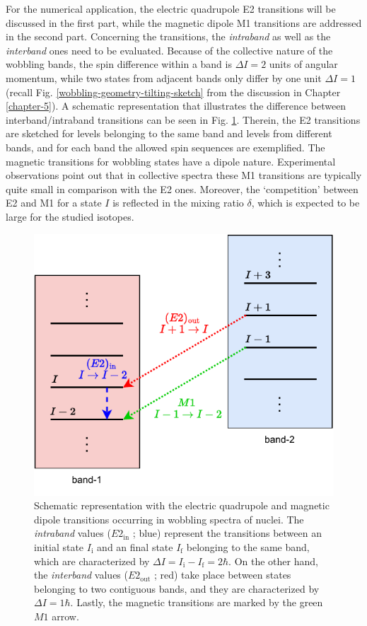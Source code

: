 For the numerical application, the electric quadrupole E2 transitions will be discussed in the first part, while the magnetic dipole M1 transitions are addressed in the second part. Concerning the transitions, the \emph{intraband} as well as the \emph{interband} ones need to be evaluated. Because of the collective nature of the wobbling bands, the spin difference within a band is $\Delta I=2$ units of angular momentum, while two states from adjacent bands only differ by one unit $\Delta I=1$ (recall Fig. \ref{wobbling-geometry-tilting-sketch} from the discussion in Chapter \ref{chapter-5}). A schematic representation that illustrates the difference between interband/intraband transitions can be seen in Fig. \ref{schematic-interband-intraband-E2}. Therein, the E2 transitions are sketched for levels belonging to the same band and levels from different bands, and for each band the allowed spin sequences are exemplified. The magnetic transitions for wobbling states have a dipole nature. Experimental observations point out that in collective spectra these M1 transitions are typically quite small in comparison with the E2 ones. Moreover, the `competition' between E2 and M1 for a state $I$ is reflected in the mixing ratio $\delta$, which is expected to be large for the studied isotopes. 
\begin{figure}
    \centering
    \includegraphics[scale=1.1]{Chapters/Figures/transitions-wobbling-states.pdf}
    \caption{Schematic representation with the electric quadrupole and magnetic dipole transitions occurring in wobbling spectra of nuclei. The \emph{intraband} values ($E2_\text{in}$ ; blue) represent the transitions between an initial state $I_\text{i}$ and an final state $I_\text{f}$ belonging to the same band, which are characterized by $\Delta I=I_\text{i}-I_\text{f}=2\hbar$. On the other hand, the \emph{interband} values ($E2_\text{out}$ ; red) take place between states belonging to two contiguous bands, and they are characterized by $\Delta I=1\hbar$. Lastly, the magnetic transitions are marked by the green $M1$ arrow.}
    \label{schematic-interband-intraband-E2}
\end{figure}


